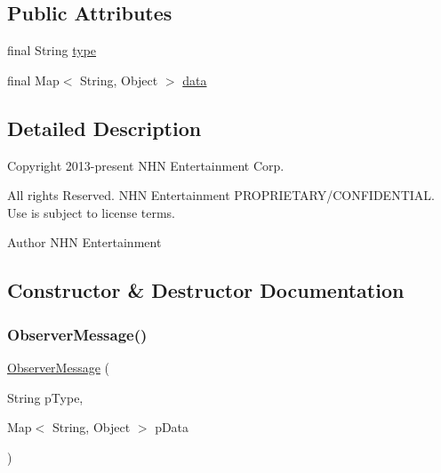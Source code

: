 \subsection*{Public Attributes}
\begin{DoxyCompactItemize}
\item 
final String \hyperlink{classcom_1_1toast_1_1android_1_1gamebase_1_1observer_1_1_observer_message_a219377fd15b88f01735409c802129c7e}{type}
\item 
final Map$<$ String, Object $>$ \hyperlink{classcom_1_1toast_1_1android_1_1gamebase_1_1observer_1_1_observer_message_ab80d27f4bfd71515a73ab1dd5d9db1ce}{data}
\end{DoxyCompactItemize}


\subsection{Detailed Description}
Copyright 2013-\/present N\+HN Entertainment Corp. 

All rights Reserved. N\+HN Entertainment P\+R\+O\+P\+R\+I\+E\+T\+A\+R\+Y/\+C\+O\+N\+F\+I\+D\+E\+N\+T\+I\+AL. Use is subject to license terms.

\begin{DoxyAuthor}{Author}
N\+HN Entertainment 
\end{DoxyAuthor}


\subsection{Constructor \& Destructor Documentation}
\mbox{\label{classcom_1_1toast_1_1android_1_1gamebase_1_1observer_1_1_observer_message_a0d17c55fa642e66ccb819f5aa479bcf0}} 
\subsubsection{\texorpdfstring{Observer\+Message()}{ObserverMessage()}}
{\footnotesize\ttfamily \hyperlink{classcom_1_1toast_1_1android_1_1gamebase_1_1observer_1_1_observer_message}{Observer\+Message} (\begin{DoxyParamCaption}\item[{String}]{p\+Type,  }\item[{Map$<$ String, Object $>$}]{p\+Data }\end{DoxyParamCaption})}



